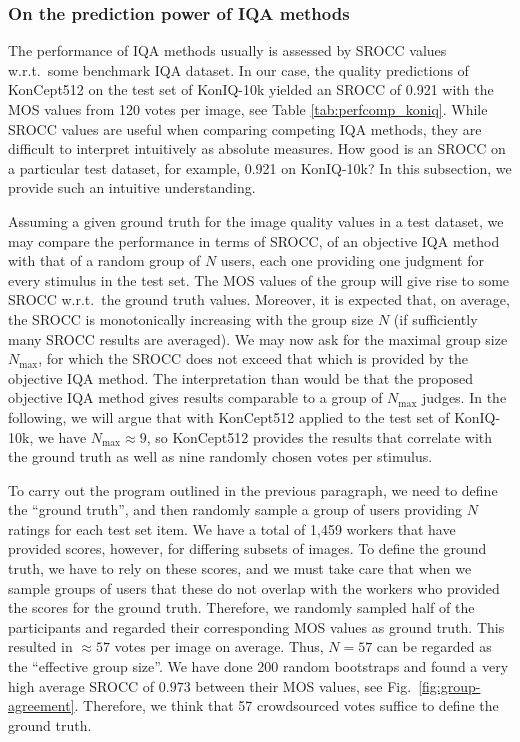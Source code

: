 \documentclass[10pt,journal,compsoc]{IEEEtran}
\begin{document}
\subsubsection{On the prediction power of IQA methods}

The performance of IQA methods usually is assessed by SROCC values w.r.t.\ some benchmark IQA dataset. In our case, the quality predictions of KonCept512 on the test set of KonIQ-10k yielded an SROCC of 0.921 with the MOS values from 120 votes per image, see Table \ref{tab:perfcomp_koniq}. While SROCC values are useful when comparing competing IQA methods, they are difficult to interpret intuitively as absolute measures. How good is an SROCC on a particular test dataset, for example, 0.921 on KonIQ-10k? In this subsection, we provide such an intuitive understanding. 

Assuming a given ground truth for the image quality values in a test dataset, we may compare the performance in terms of SROCC, of an objective IQA method with that of a random group of $N$ users, each one providing one judgment for every stimulus in the test set. The MOS values of the group will give rise to some SROCC w.r.t.\ the ground truth values. Moreover, it is expected that, on average, the SROCC is monotonically increasing with the group size $N$ (if sufficiently many SROCC results are averaged). We may now ask for the maximal group size $N_\text{max}$, for which the SROCC does not exceed that which is provided by the objective IQA method. The interpretation than would be that the proposed objective IQA method gives results comparable to a group of $N_\text{max}$ judges. In the following, we will argue that with KonCept512 applied to the test set of KonIQ-10k, we have $N_\text{max} \approx 9$, so KonCept512 provides the results that correlate with the ground truth as well as nine randomly chosen votes per stimulus.


To carry out the program outlined in the previous paragraph, we need to define the ``ground truth'', and then randomly sample a group of users providing $N$ ratings for each test set item. We have a total of 1,459 workers that have provided scores, however, for differing subsets of images. To define the ground truth, we have to rely on these scores, and we must take care that when we sample groups of users that these do not overlap with the workers who provided the scores for the ground truth. Therefore, we randomly sampled half of the participants and regarded their corresponding MOS values as ground truth. This resulted in $\approx57$ votes per image on average. Thus, $N=57$ can be regarded as the ``effective group size''. We have done 200 random bootstraps and found a very high average SROCC of $0.973$ between their MOS values, see Fig.\ \ref{fig:group-agreement}. Therefore, we think that 57 crowdsourced votes suffice to define the ground truth. 
\end{document}
